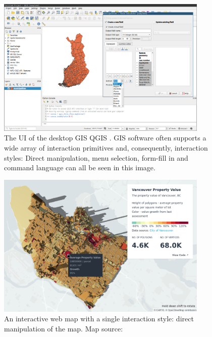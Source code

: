 \begin{figure}[H]
	\centering
	\includegraphics[width=0.9\textwidth]{visual/figures/screenshots/qgis_interface.png}
	\caption{
		The UI of the desktop GIS QGIS \parencite{qgis}.
		GIS software often supports a wide array of interaction primitives and,
		consequently, interaction styles:
		Direct manipulation, menu selection, form-fill in and command language
		can all be seen in this image.
	}
	\label{fig:qgis}
\end{figure}

\begin{figure}[H]
	\centering
	\includegraphics[width=0.9\textwidth]{visual/figures/screenshots/simple_web_map.png}
	\caption{
		An interactive web map with a single interaction style:
		direct manipulation of the map.
		Map source: \textcite{deckgl-ex}
	}
	\label{fig:simple web map}
\end{figure}



